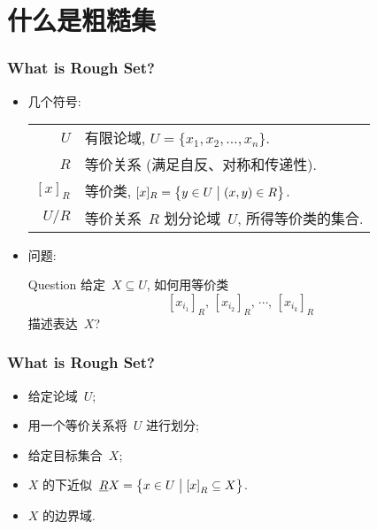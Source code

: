 \documentclass[notheorems,mathserif,table]{beamer}
\def\hilite<#1>{\temporal<#1>{\color{gray!85}}{\color{black}}{\color{gray!35}}}
\begin{document}
\section{什么是粗糙集}
\begin{frame}\frametitle{What is Rough Set?}
\begin{itemize}
 \item 几个符号:
 \begin{center}
  \setlength{\extrarowheight}{1.5mm}
   \begin{tabular}{rl}
      $U$         & 有限论域, $U=\big\{x_1,x_2 , \ldots ,x_n\big\}$.                 \\
      $R$         & 等价关系 (满足自反、对称和传递性).                                 \\
      ${[x]_R}$   & 等价类,  $[x]_R = \big\{ y \in U \bigm|\left( {x,y} \right) \in R\big\}$. \\
      $U/R$       & 等价关系~$R$ 划分论域~$U$, 所得等价类的集合.              \\
    \end{tabular}
 \end{center}\pause
  \item {\heiti 问题: }

  \begin{alertblock}{Question}
     给定~$ X \subseteq U$, 如何用等价类
     \[
     \left[ {x_{i_1} } \right]_R,\, \left[ {x_{i_2} } \right]_R,\, \cdots,\, \left[{x_{i_k} }\right]_R
     \]
    描述表达~$X$?
  \end{alertblock}
\end{itemize}
\end{frame}
\begin{frame}
\frametitle{What is Rough Set?}
\begin{itemize}
\hilite<1> \item 给定论域~$U$;  %
\hilite<2> \item 用一个等价关系将~$U$ 进行划分;
\hilite<3> \item 给定目标集合~$X$;
\hilite<4> \item $X$ 的下近似~$\underline R X  =\left\{ {x \in U\bigm|\left[ x \right]_R  \subseteq X} \right\}$.
\hilite<5> \item $X$ 的边界域.
\end{itemize}

\end{frame}
\end{document}
